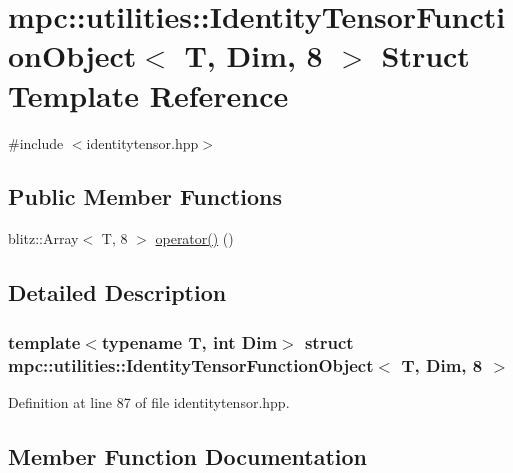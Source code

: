 \hypertarget{structmpc_1_1utilities_1_1_identity_tensor_function_object_3_01_t_00_01_dim_00_018_01_4}{}\section{mpc\+:\+:utilities\+:\+:Identity\+Tensor\+Function\+Object$<$ T, Dim, 8 $>$ Struct Template Reference}
\label{structmpc_1_1utilities_1_1_identity_tensor_function_object_3_01_t_00_01_dim_00_018_01_4}


{\ttfamily \#include $<$identitytensor.\+hpp$>$}

\subsection*{Public Member Functions}
\begin{DoxyCompactItemize}
\item 
blitz\+::\+Array$<$ T, 8 $>$ \mbox{\hyperlink{structmpc_1_1utilities_1_1_identity_tensor_function_object_3_01_t_00_01_dim_00_018_01_4_a870c6b5176c8d8a3b9db38d1cb4deb9b}{operator()}} ()
\end{DoxyCompactItemize}


\subsection{Detailed Description}
\subsubsection*{template$<$typename T, int Dim$>$\newline
struct mpc\+::utilities\+::\+Identity\+Tensor\+Function\+Object$<$ T, Dim, 8 $>$}



Definition at line 87 of file identitytensor.\+hpp.



\subsection{Member Function Documentation}
\mbox{\label{structmpc_1_1utilities_1_1_identity_tensor_function_object_3_01_t_00_01_dim_00_018_01_4_a870c6b5176c8d8a3b9db38d1cb4deb9b}} 
